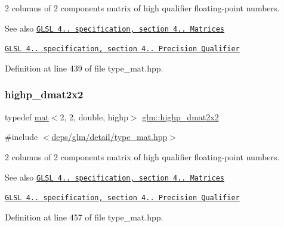 2 columns of 2 components matrix of high qualifier floating-\/point numbers.

\begin{DoxySeeAlso}{See also}
\href{http://www.opengl.org/registry/doc/GLSLangSpec.4.20.8.pdf}{\tt G\+L\+SL 4.. specification, section 4.. Matrices} 

\href{http://www.opengl.org/registry/doc/GLSLangSpec.4.20.8.pdf}{\tt G\+L\+SL 4.. specification, section 4.. Precision Qualifier} 
\end{DoxySeeAlso}


Definition at line 439 of file type\+\_\+mat.\+hpp.

\mbox{\label{group__core__precision_gad08aec6bf6b5ae7d486fbabb3b28f904}} 
\subsubsection{\texorpdfstring{highp\+\_\+dmat2x2}{highp\_dmat2x2}}
{\footnotesize\ttfamily typedef \hyperlink{structglm_1_1mat}{mat}$<$2, 2, double, highp$>$ \hyperlink{group__core__precision_gad08aec6bf6b5ae7d486fbabb3b28f904}{glm\+::highp\+\_\+dmat2x2}}



{\ttfamily \#include $<$\hyperlink{type__mat_8hpp}{deps/glm/detail/type\+\_\+mat.\+hpp}$>$}

2 columns of 2 components matrix of high qualifier floating-\/point numbers.

\begin{DoxySeeAlso}{See also}
\href{http://www.opengl.org/registry/doc/GLSLangSpec.4.20.8.pdf}{\tt G\+L\+SL 4.. specification, section 4.. Matrices} 

\href{http://www.opengl.org/registry/doc/GLSLangSpec.4.20.8.pdf}{\tt G\+L\+SL 4.. specification, section 4.. Precision Qualifier} 
\end{DoxySeeAlso}


Definition at line 457 of file type\+\_\+mat.\+hpp.

\mbox{\label{group__core__precision_gad7de433cb7f79959a191fc5c64fbfc4e}} 
